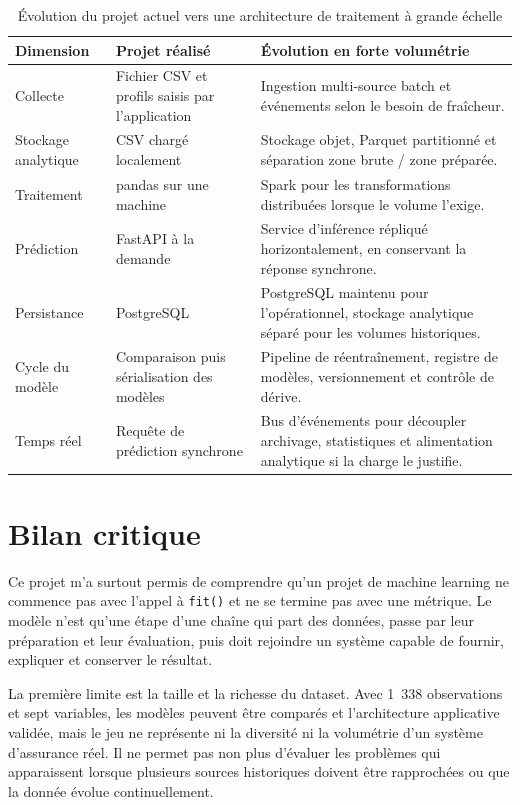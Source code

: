 \begin{table}[H]
\centering
\small
\begin{tabular}{p{3.5cm} p{4.8cm} p{5.8cm}}
\toprule
\textbf{Dimension} & \textbf{Projet réalisé} & \textbf{Évolution en forte volumétrie} \\
\midrule
Collecte & Fichier CSV et profils saisis par l'application & Ingestion multi-source batch et événements selon le besoin de fraîcheur. \\
Stockage analytique & CSV chargé localement & Stockage objet, Parquet partitionné et séparation zone brute / zone préparée. \\
Traitement & pandas sur une machine & Spark pour les transformations distribuées lorsque le volume l'exige. \\
Prédiction & FastAPI à la demande & Service d'inférence répliqué horizontalement, en conservant la réponse synchrone. \\
Persistance & PostgreSQL & PostgreSQL maintenu pour l'opérationnel, stockage analytique séparé pour les volumes historiques. \\
Cycle du modèle & Comparaison puis sérialisation des modèles & Pipeline de réentraînement, registre de modèles, versionnement et contrôle de dérive. \\
Temps réel & Requête de prédiction synchrone & Bus d'événements pour découpler archivage, statistiques et alimentation analytique si la charge le justifie. \\
\bottomrule
\end{tabular}
\caption{Évolution du projet actuel vers une architecture de traitement à grande échelle}
\label{tab:insurance-scale}
\end{table}

\section{Bilan critique}

Ce projet m'a surtout permis de comprendre qu'un projet de machine learning ne commence pas avec l'appel à \texttt{fit()} et ne se termine pas avec une métrique. Le modèle n'est qu'une étape d'une chaîne qui part des données, passe par leur préparation et leur évaluation, puis doit rejoindre un système capable de fournir, expliquer et conserver le résultat.

La première limite est la taille et la richesse du dataset. Avec 1~338 observations et sept variables, les modèles peuvent être comparés et l'architecture applicative validée, mais le jeu ne représente ni la diversité ni la volumétrie d'un système d'assurance réel. Il ne permet pas non plus d'évaluer les problèmes qui apparaissent lorsque plusieurs sources historiques doivent être rapprochées ou que la donnée évolue continuellement.

